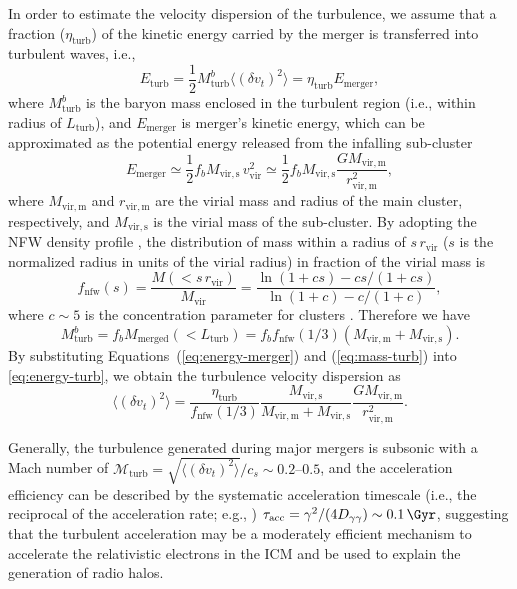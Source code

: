 \documentclass[modern]{aastex62}
\newcommand{\R}[1]{\mathrm{#1}}
\begin{document}
In order to estimate the velocity dispersion of the turbulence, we assume
that a fraction ($\eta_{\R{turb}}$) of the kinetic energy carried by the
merger is transferred into turbulent waves, i.e.,
\begin{equation}
  \label{eq:energy-turb}
  E_{\R{turb}} = \frac{1}{2} M_{\R{turb}}^b
    \langle (\delta{v_t})^2 \rangle = \eta_{\R{turb}} E_{\R{merger}},
\end{equation}
where
$M_{\R{turb}}^b$ is the baryon mass enclosed in the turbulent region
(i.e., within radius of $L_{\R{turb}}$),
and $E_{\R{merger}}$ is merger's kinetic energy, which can be approximated
as the potential energy released from the infalling sub-cluster
\begin{equation}
  \label{eq:energy-merger}
  E_{\R{merger}} \simeq \frac{1}{2} f_b M_{\R{vir,s}} \,v^2_{\R{vir}}
    \simeq \frac{1}{2} f_b M_{\R{vir,s}}
    \frac{G M_{\R{vir,m}}}{r^2_{\R{vir,m}}},
\end{equation}
where
$M_{\R{vir,m}}$ and $r_{\R{vir,m}}$ are the virial mass and radius of the
main cluster, respectively, and $M_{\R{vir,s}}$ is the virial mass of the
sub-cluster.
By adopting the NFW density profile \citep{navarro1997}, the distribution
of mass within a radius of $s \,r_{\R{vir}}$ ($s$ is the normalized radius
in units of the virial radius) in fraction of the virial mass is
\begin{equation}
  \label{eq:mass-dist-nfw}
  f_{\R{nfw}}(s) = \frac{M(< s \,r_{\R{vir}})}{M_{\R{vir}}} =
    \frac{\ln(1 + c s) - c s / (1 + c s)}{\ln(1 + c) - c / (1 + c)},
\end{equation}
where
$c \sim 5$ is the concentration parameter for clusters \citep{lokas2001}.
Therefore we have
\begin{equation}
  \label{eq:mass-turb}
  M_{\R{turb}}^b = f_b M_{\R{merged}}(<L_{\R{turb}})
    = f_b f_{\R{nfw}}(1/3) (M_{\R{vir,m}} + M_{\R{vir,s}}).
\end{equation}
By substituting Equations~(\ref{eq:energy-merger}) and (\ref{eq:mass-turb})
into \autoref{eq:energy-turb}, we obtain the turbulence velocity dispersion
as
\begin{equation}
  \label{eq:turb-velocity-dispersion}
  \langle (\delta{v_t})^2 \rangle =
    \frac{\eta_{\R{turb}}}{f_{\R{nfw}}(1/3)}
    \frac{M_{\R{vir,s}}}{M_{\R{vir,m}} + M_{\R{vir,s}}}
    \frac{G M_{\R{vir,m}}}{r^2_{\R{vir,m}}}.
\end{equation}

Generally, the turbulence generated during major mergers is subsonic
with a Mach number of
$\mathcal{M}_{\R{turb}} = \sqrt{\langle (\delta{v_t})^2 \rangle} / c_s
  \sim \numrange{0.2}{0.5}$,
and the acceleration efficiency can be described by the systematic
acceleration timescale (i.e., the reciprocal of the acceleration rate;
e.g., \citealt{brunetti2011})
$\tau_{\R{acc}} = \gamma^2 / (4 D_{\gamma\gamma}) \sim \SI{0.1}{\Gyr}$,
suggesting that the turbulent acceleration may be a moderately efficient
mechanism to accelerate the relativistic electrons in the ICM and be used
to explain the generation of radio halos.
\end{document}
